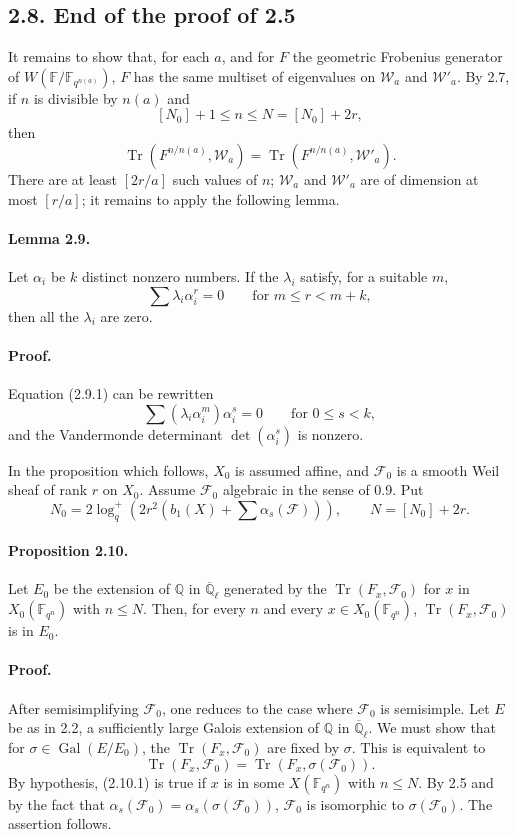\documentclass[10pt]{article}
\newcommand{\F}{\mathbb{F}}
\newcommand{\Q}{\mathbb{Q}}
\newcommand{\Ql}{\overline{\mathbb Q}_{\ell}}
\newcommand{\Tr}{\operatorname{Tr}}
\newcommand{\Gal}{\operatorname{Gal}}
\begin{document}
\subsection*{2.8. End of the proof of 2.5}
It remains to show that, for each $a$, and for $F$ the geometric Frobenius generator of $W(\F/\F_{q^{n(a)}})$, $F$ has the same multiset of eigenvalues on $\mathcal W_a$ and $\mathcal W'_a$.
By 2.7, if $n$ is divisible by $n(a)$ and
\[
 [N_0]+1\le n\le N=[N_0]+2r,
\]
then
\[
 \Tr(F^{n/n(a)},\mathcal W_a)=\Tr(F^{n/n(a)},\mathcal W'_a).
\]
There are at least $[2r/a]$ such values of $n$; $\mathcal W_a$ and $\mathcal W'_a$ are of dimension at most $[r/a]$; it remains to apply the following lemma.

\paragraph{Lemma 2.9.}
Let $\alpha_i$ be $k$ distinct nonzero numbers.
If the $\lambda_i$ satisfy, for a suitable $m$,
\begin{equation}
 \sum\lambda_i\alpha_i^r=0\qquad\text{for }m\le r<m+k,
\tag{2.9.1}
\end{equation}
then all the $\lambda_i$ are zero.

\paragraph{Proof.}
Equation (2.9.1) can be rewritten
\[
 \sum(\lambda_i\alpha_i^m)\alpha_i^s=0\qquad\text{for }0\le s<k,
\]
and the Vandermonde determinant $\det(\alpha_i^s)$ is nonzero.

In the proposition which follows, $X_0$ is assumed affine, and $\mathcal F_0$ is a smooth Weil sheaf of rank $r$ on $X_0$.
Assume $\mathcal F_0$ algebraic in the sense of 0.9.
Put
\[
 N_0=2\log_q^+\left(2r^2\left(b_1(X)+\sum\alpha_s(\mathcal F)\right)\right),\qquad
 N=[N_0]+2r.
\]

\paragraph{Proposition 2.10.}
Let $E_0$ be the extension of $\Q$ in $\Ql$ generated by the $\Tr(F_x,\mathcal F_0)$ for $x$ in $X_0(\F_{q^n})$ with $n\le N$.
Then, for every $n$ and every $x\in X_0(\F_{q^n})$, $\Tr(F_x,\mathcal F_0)$ is in $E_0$.

\paragraph{Proof.}
After semisimplifying $\mathcal F_0$, one reduces to the case where $\mathcal F_0$ is semisimple.
Let $E$ be as in 2.2, a sufficiently large Galois extension of $\Q$ in $\Ql$.
We must show that for $\sigma\in\Gal(E/E_0)$, the $\Tr(F_x,\mathcal F_0)$ are fixed by $\sigma$.
This is equivalent to
\begin{equation}
 \Tr(F_x,\mathcal F_0)=\Tr(F_x,\sigma(\mathcal F_0)).
\tag{2.10.1}
\end{equation}
By hypothesis, (2.10.1) is true if $x$ is in some $X(\F_{q^n})$ with $n\le N$.
By 2.5 and by the fact that $\alpha_s(\mathcal F_0)=\alpha_s(\sigma(\mathcal F_0))$, $\mathcal F_0$ is isomorphic to $\sigma(\mathcal F_0)$.
The assertion follows.
\end{document}
